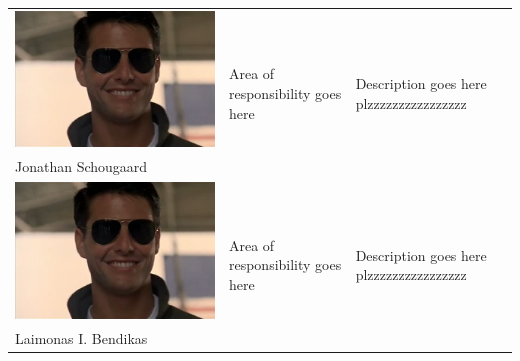 \begin{tabular}[c]{|p{3cm}| p{5cm} | p{6cm}|}
	\phantom{Test}
	\includegraphics[scale=0.54]{Introduction/TeamPictures/TomC} & \multirow{2}{5cm}{Area of responsibility goes here} & \multirow{2}{6cm}{Description goes here plzzzzzzzzzzzzzzzz} \\
	Jonathan Schougaard & & \\ \hline
	
	\phantom{Test}
	\includegraphics[scale=0.54]{Introduction/TeamPictures/TomC} & \multirow{2}{5cm}{Area of responsibility goes here} & \multirow{2}{6cm}{Description goes here plzzzzzzzzzzzzzzzz} \\
	Laimonas I. \newline Bendikas & & \\ \hline
	

\end{tabular}
